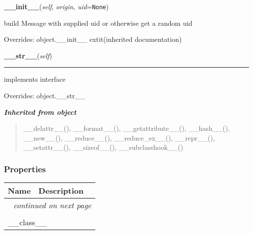     \vspace{0.5ex}

\hspace{.8\funcindent}\begin{boxedminipage}{\funcwidth}

    \raggedright \textbf{\_\_init\_\_}(\textit{self}, \textit{origin}, \textit{uid}={\tt None})

\setlength{\parskip}{2ex}
    build Message with supplied uid or otherwise get a random uid

\setlength{\parskip}{1ex}
      Overrides: object.\_\_init\_\_ 	extit{(inherited documentation)}

    \end{boxedminipage}

    \vspace{0.5ex}

\hspace{.8\funcindent}\begin{boxedminipage}{\funcwidth}

    \raggedright \textbf{\_\_str\_\_}(\textit{self})

    \vspace{-1.5ex}

    \rule{\textwidth}{0.5\fboxrule}
\setlength{\parskip}{2ex}
    implements interface

\setlength{\parskip}{1ex}
      Overrides: object.\_\_str\_\_

    \end{boxedminipage}


\large{\textbf{\textit{Inherited from object}}}

\begin{quote}
\_\_delattr\_\_(), \_\_format\_\_(), \_\_getattribute\_\_(), \_\_hash\_\_(), \_\_new\_\_(), \_\_reduce\_\_(), \_\_reduce\_ex\_\_(), \_\_repr\_\_(), \_\_setattr\_\_(), \_\_sizeof\_\_(), \_\_subclasshook\_\_()
\end{quote}


  \subsubsection{Properties}

    \vspace{-1cm}
\hspace{\varindent}\begin{longtable}{|p{\varnamewidth}|p{\vardescrwidth}|l}
\cline{1-2}
\cline{1-2} \centering \textbf{Name} & \centering \textbf{Description}& \\
\cline{1-2}
\endhead\cline{1-2}\multicolumn{3}{r}{\small\textit{continued on next page}}\\\endfoot\cline{1-2}
\endlastfoot\multicolumn{2}{|l|}{\textit{Inherited from object}}\\
\multicolumn{2}{|p{\varwidth}|}{\raggedright \_\_class\_\_}\\
\cline{1-2}
\end{longtable}


